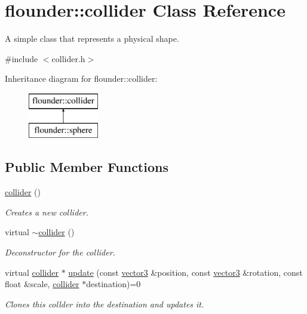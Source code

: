 \hypertarget{classflounder_1_1collider}{}\section{flounder\+:\+:collider Class Reference}
\label{classflounder_1_1collider}


A simple class that represents a physical shape.  




{\ttfamily \#include $<$collider.\+h$>$}

Inheritance diagram for flounder\+:\+:collider\+:\begin{figure}[H]
\begin{center}
\leavevmode
\includegraphics[height=2.000000cm]{classflounder_1_1collider}
\end{center}
\end{figure}
\subsection*{Public Member Functions}
\begin{DoxyCompactItemize}
\item 
\hyperlink{classflounder_1_1collider_ab5398fd751ea6beaeb3d85777633392b}{collider} ()
\begin{DoxyCompactList}\small\item\em Creates a new collider. \end{DoxyCompactList}\item 
virtual \hyperlink{classflounder_1_1collider_a4d79dbd4483027db6d7080887bcf26e6}{$\sim$collider} ()
\begin{DoxyCompactList}\small\item\em Deconstructor for the collider. \end{DoxyCompactList}\item 
virtual \hyperlink{classflounder_1_1collider}{collider} $\ast$ \hyperlink{classflounder_1_1collider_ae185e877868e8783e28e8d74120f2f2b}{update} (const \hyperlink{classflounder_1_1vector3}{vector3} \&position, const \hyperlink{classflounder_1_1vector3}{vector3} \&rotation, const float \&scale, \hyperlink{classflounder_1_1collider}{collider} $\ast$destination)=0
\begin{DoxyCompactList}\small\item\em Clones this collder into the destination and updates it. \end{DoxyCompactList}\end{DoxyCompactItemize}


